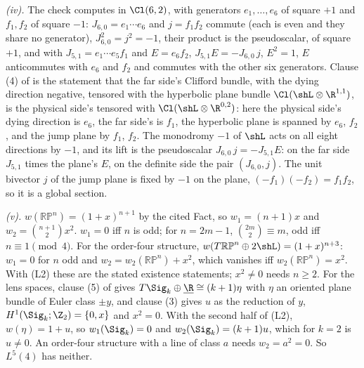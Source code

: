 \emph{(iv).} The check computes in $\Cl(6,2)$, with generators $e_{1}, \dots, e_{6}$ of square $+1$ and $f_{1}, f_{2}$ of square $-1$: $J_{6,0} = e_{1}\cdots e_{6}$ and $j = f_{1}f_{2}$ commute (each is even and they share no generator), $J_{6,0}^{2} = j^{2} = -1$, their product is the pseudoscalar, of square $+1$, and with $J_{5,1} = e_{1}\cdots e_{5}f_{1}$ and $E = e_{6}f_{2}$, $J_{5,1}E = -J_{6,0}\,j$, $E^{2} = 1$, $E$ anticommutes with $e_{6}$ and $f_{2}$ and commutes with the other six generators. Clause (4) of  is the statement that the far side's Clifford bundle, with the dying direction negative, tensored with the hyperbolic plane bundle $\Cl(\shL \otimes \R^{1,1})$, is the physical side's tensored with $\Cl(\shL \otimes \R^{0,2})$: here the physical side's dying direction is $e_{6}$, the far side's is $f_{1}$, the hyperbolic plane is spanned by $e_{6}$, $f_{2}$, and the jump plane by $f_{1}$, $f_{2}$. The monodromy $-1$ of $\shL$ acts on all eight directions by $-1$, and its lift is the pseudoscalar $J_{6,0}\,j = -J_{5,1}E$: on the far side $J_{5,1}$ times the plane's $E$, on the definite side the pair $(J_{6,0}, j)$. The unit bivector $j$ of the jump plane is fixed by $-1$ on the plane, $(-f_{1})(-f_{2}) = f_{1}f_{2}$, so it is a global section.

\emph{(v).} $w(\mathbb{RP}^{n}) = (1 + x)^{n+1}$ by the cited Fact, so $w_{1} = (n + 1)x$ and $w_{2} = \binom{n+1}{2}x^{2}$. $w_{1} = 0$ iff $n$ is odd; for $n = 2m - 1$, $\binom{2m}{2} \equiv m$, odd iff $n \equiv 1 \pmod 4$. For the order-four structure, $w(T\mathbb{RP}^{n} \oplus 2\shL) = (1 + x)^{n+3}$: $w_{1} = 0$ for $n$ odd and $w_{2} = w_{2}(\mathbb{RP}^{n}) + x^{2}$, which vanishes iff $w_{2}(\mathbb{RP}^{n}) = x^{2}$. With (L2) these are the stated existence statements; $x^{2} \neq 0$ needs $n \geq 2$. For the lens spaces, clause (5) of  gives $T\Sig_{k} \oplus \underline{\R} \cong (k + 1)\eta$ with $\eta$ an oriented plane bundle of Euler class $\pm y$, and clause (3) gives $u$ as the reduction of $y$, $H^{1}(\Sig_{k}; \Z_{2}) = \{0, x\}$ and $x^{2} = 0$. With the second half of (L2), $w(\eta) = 1 + u$, so $w_{1}(\Sig_{k}) = 0$ and $w_{2}(\Sig_{k}) = (k + 1)u$, which for $k = 2$ is $u \neq 0$. An order-four structure with a line of class $a$ needs $w_{2} = a^{2} = 0$. So $L^{5}(4)$ has neither.

